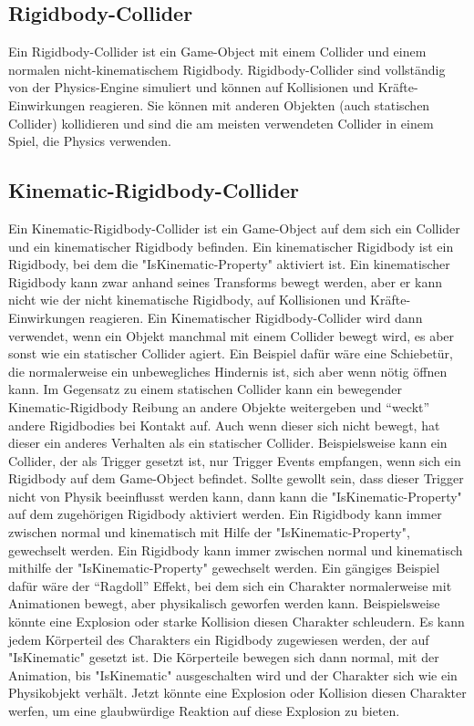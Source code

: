 \subsection{Rigidbody-Collider}
Ein Rigidbody-Collider ist ein Game-Object mit einem Collider und einem normalen nicht-kinematischem Rigidbody. Rigidbody-Collider sind vollständig von der Physics-Engine simuliert und können auf Kollisionen und Kräfte-Einwirkungen reagieren. Sie können mit anderen Objekten (auch statischen Collider) kollidieren und sind die am meisten verwendeten Collider in einem Spiel, die Physics verwenden.
\cite{_staticCollider}

\subsection{Kinematic-Rigidbody-Collider}
Ein Kinematic-Rigidbody-Collider ist ein Game-Object auf dem sich ein Collider und ein kinematischer Rigidbody befinden. Ein kinematischer Rigidbody ist ein Rigidbody, bei dem die "IsKinematic-Property" aktiviert ist. Ein kinematischer Rigidbody kann zwar anhand seines Transforms bewegt werden, aber er kann nicht wie der nicht kinematische Rigidbody, auf Kollisionen und Kräfte-Einwirkungen reagieren. Ein Kinematischer Rigidbody-Collider wird dann verwendet, wenn ein Objekt manchmal mit einem Collider bewegt wird, es aber sonst wie ein statischer Collider agiert.\cite{_staticCollider}
Ein Beispiel dafür wäre eine Schiebetür, die normalerweise ein unbewegliches Hindernis ist, sich aber wenn nötig öffnen kann. Im Gegensatz zu einem statischen Collider kann ein bewegender Kinematic-Rigidbody Reibung an andere Objekte weitergeben und "`weckt"' andere Rigidbodies bei Kontakt auf.
Auch wenn dieser sich nicht bewegt, hat dieser ein anderes Verhalten als ein statischer Collider. Beispielsweise kann ein Collider, der als Trigger gesetzt ist, nur Trigger Events empfangen, wenn sich ein Rigidbody auf dem Game-Object befindet. Sollte gewollt sein, dass dieser Trigger nicht von Physik beeinflusst werden kann, dann kann die "IsKinematic-Property" auf dem zugehörigen Rigidbody aktiviert werden. Ein Rigidbody kann immer zwischen normal und kinematisch mit Hilfe der "IsKinematic-Property", gewechselt werden. Ein Rigidbody kann immer zwischen normal und kinematisch mithilfe der "IsKinematic-Property" gewechselt werden. Ein gängiges Beispiel dafür wäre der "`Ragdoll"' Effekt, bei dem sich ein Charakter normalerweise mit Animationen bewegt, aber physikalisch geworfen werden kann. Beispielsweise könnte eine Explosion oder starke Kollision diesen Charakter schleudern. Es kann jedem Körperteil des Charakters ein Rigidbody zugewiesen werden, der auf "IsKinematic" gesetzt ist. Die Körperteile bewegen sich dann normal, mit der Animation, bis "IsKinematic" ausgeschalten wird und der Charakter sich wie ein Physikobjekt verhält. Jetzt könnte eine Explosion oder Kollision diesen Charakter werfen, um eine glaubwürdige Reaktion auf diese Explosion zu bieten.

\cite{_staticCollider}
